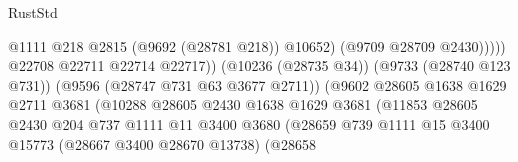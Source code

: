 \begin{lexlean}{RustStd}
\begin{coremodule}
                                                              @1111
                                                              @218
                                                              @2815
                                                              (@9692 (@28781 @218))
                                                              @10652)
                                                            (@9709 @28709 @2430)))))
                                                    @22708
                                                    @22711
                                                    @22714
                                                    @22717))
                                                (@10236 (@28735 @34))
                                                (@9733 (@28740 @123 @731))
                                                (@9596 (@28747 @731 @63 @3677 @2711))
                                                (@9602
                                                  @28605
                                                  @1638
                                                  @1629
                                                  @2711
                                                  @3681
                                                  (@10288
                                                    @28605
                                                    @2430
                                                    @1638
                                                    @1629
                                                    @3681
                                                    (@11853
                                                      @28605
                                                      @2430
                                                      @204
                                                      @737
                                                      @1111
                                                      @11
                                                      @3400
                                                      @3680
                                                      (@28659
                                                        @739
                                                        @1111
                                                        @15
                                                        @3400
                                                        @15773
                                                        (@28667 @3400 @28670 @13738)
                                                        (@28658

\end{coremodule}
\end{lexlean}
